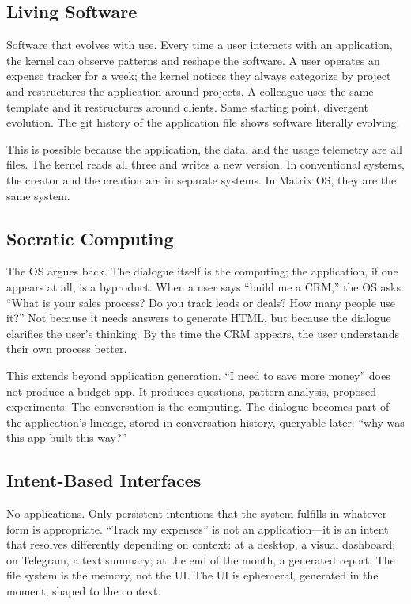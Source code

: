 \documentclass[11pt,a4paper]{article}
\begin{document}
\subsection{Living Software}

Software that evolves with use. Every time a user interacts with an application, the kernel can observe patterns and reshape the software. A user operates an expense tracker for a week; the kernel notices they always categorize by project and restructures the application around projects. A colleague uses the same template and it restructures around clients. Same starting point, divergent evolution. The git history of the application file shows software literally evolving.

This is possible because the application, the data, and the usage telemetry are all files. The kernel reads all three and writes a new version. In conventional systems, the creator and the creation are in separate systems. In Matrix OS, they are the same system.

\subsection{Socratic Computing}

The OS argues back. The dialogue itself is the computing; the application, if one appears at all, is a byproduct. When a user says ``build me a CRM,'' the OS asks: ``What is your sales process? Do you track leads or deals? How many people use it?'' Not because it needs answers to generate HTML, but because the dialogue clarifies the user's thinking. By the time the CRM appears, the user understands their own process better.

This extends beyond application generation. ``I need to save more money'' does not produce a budget app. It produces questions, pattern analysis, proposed experiments. The conversation is the computing. The dialogue becomes part of the application's lineage, stored in conversation history, queryable later: ``why was this app built this way?''

\subsection{Intent-Based Interfaces}

No applications. Only persistent intentions that the system fulfills in whatever form is appropriate. ``Track my expenses'' is not an application---it is an intent that resolves differently depending on context: at a desktop, a visual dashboard; on Telegram, a text summary; at the end of the month, a generated report. The file system is the memory, not the UI. The UI is ephemeral, generated in the moment, shaped to the context.
\end{document}
